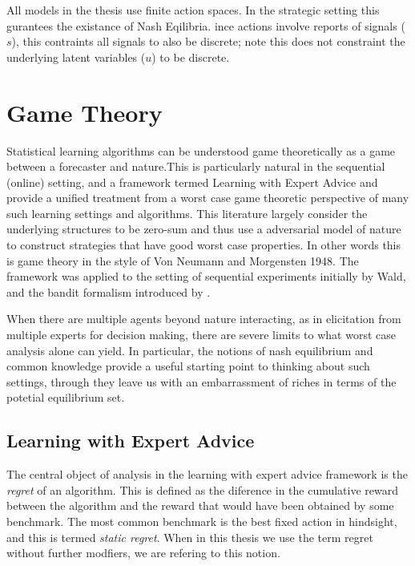 
All models in the thesis use finite action spaces. In the strategic setting this gurantees the existance of Nash Eqilibria. 
ince actions involve reports of signals ($s$), this contraints all signals to also be discrete; note this does not constraint the underlying latent variables ($u$) to be discrete.



\section{Game Theory}

Statistical learning algorithms can be understood game theoretically as a game between a forecaster and nature.This is particularly natural in the sequential (online) setting, and a framework termed Learning with Expert Advice and \cite{cesa2006prediction} provide a unified treatment from a worst case game theoretic perspective of many such learning settings and algorithms.
This literature largely consider the underlying structures to be zero-sum and thus use a adversarial model of nature to construct strategies that have good worst case properties. In other words this is game theory in the style of Von Neumann and Morgensten 1948. The framework was applied to the setting of sequential experiments initially by Wald, and the bandit formalism introduced by \cite{robbins1952some}.

When there are multiple agents beyond nature interacting, as in elicitation from multiple experts for decision making, there are severe limits to what worst case analysis alone can yield. 
In particular, the notions of nash equilibrium \cite{nash1950equilibrium} and common knowledge \cite{aumann1976agreeing} provide a useful starting point to thinking about such settings, through they leave us with an embarrassment of riches in terms of the potetial equilibrium set.


\subsection{Learning with Expert Advice}


The central object of analysis in the learning with expert advice framework is the \emph{regret} of an algorithm. This is defined as the diference in the cumulative reward between the algorithm and the reward that would have been obtained by some benchmark. 
The most common benchmark is the best fixed action in hindsight, and this is termed \emph{static regret}. When in this thesis we use the term regret without further modfiers, we are refering to this notion.

